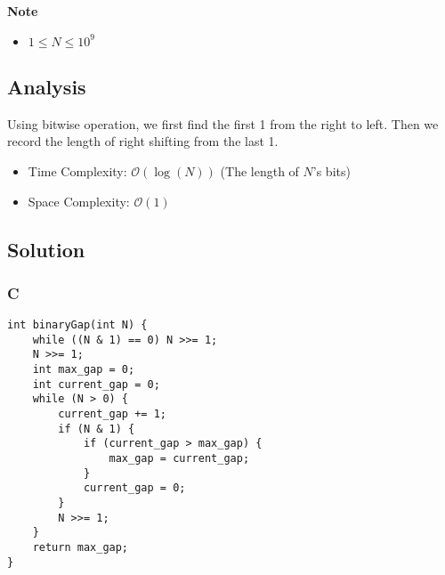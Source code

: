 \textbf{Note}
\begin{itemize}
\item $1 \le N \le 10^9$
\end{itemize}

\subsection*{Analysis}
Using bitwise operation, we first find the first 1 from the right to left. Then we record the length of right shifting from the last 1.
\begin{itemize}
\item Time Complexity: $\mathcal{O}(\log(N))$ (The length of $N$'s bits)
\item Space Complexity: $\mathcal{O}(1)$
\end{itemize}

\subsection*{Solution}
\subsubsection*{C}
\begin{verbatim}
int binaryGap(int N) {
    while ((N & 1) == 0) N >>= 1;
    N >>= 1;
    int max_gap = 0;
    int current_gap = 0;
    while (N > 0) {
        current_gap += 1;
        if (N & 1) {
            if (current_gap > max_gap) {
                max_gap = current_gap;
            }
            current_gap = 0;
        }
        N >>= 1;
    }
    return max_gap;
}
\end{verbatim}

\newpage

